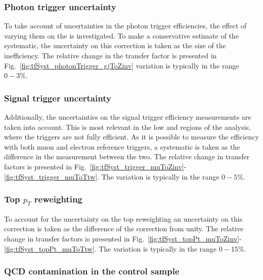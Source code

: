 %
\subsubsection*{Photon trigger uncertainty}
\label{sec:tfSyst_photonTrigger}

To take account of uncertainties in the photon trigger efficiencies, the
effect of varying them on the \gj \TF is investigated. To make a
conservative estimate of the systematic, the uncertainty on this
correction is taken as the size of the inefficiency.  The relative
change in the \gj transfer factor is presented in
Fig.~\ref{fig:tfSyst_photonTrigger_gjToZinv} variation is typically in
the range $0-3\%$.

\subsubsection*{Signal trigger uncertainty}
\label{sec:tfSyst_trigger}

Additionally, the uncertainties on the signal trigger efficiency
measurements are taken into account. This is most relevant in the low
\HT and \MHT regions of the analysis, where the triggers are not fully
efficient. As it is possible to measure the efficiency with both muon
and electron reference triggers, a systematic is taken as the
difference in the measurement between the two.  The relative change in
transfer factors is presented in Fig.~\ref{fig:tfSyst_trigger_muToZinv}-\ref{fig:tfSyst_trigger_muToTtw}.
The variation is typically in the range $0-5\%$.

\subsubsection*{Top $p_T$ reweighting}
\label{sec:tfSyst_topPt}

To account for the uncertainty on the top \pT reweighting an 
uncertainty on this correction is taken as the difference of the
correction from unity. The relative change in transfer factors is
presented in Fig.~\ref{fig:tfSyst_topPt_muToZinv}-\ref{fig:tfSyst_topPt_muToTtw}. The
variation is typically in the range $0-15\%$.

\subsubsection*{QCD contamination in the \gj control sample}
\label{sec:tfSyst_qcdCont}

